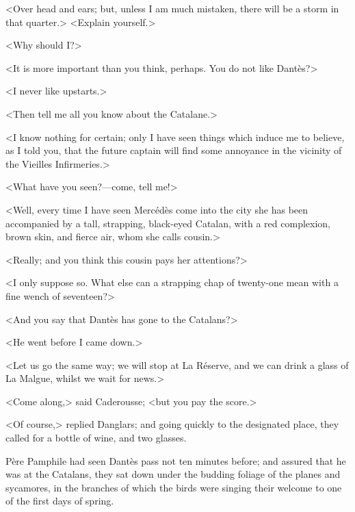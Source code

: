  <Over head and ears; but, unless I am much mistaken, there will be a storm in that quarter.>  <Explain yourself.> 

 <Why should I?> 

 <It is more important than you think, perhaps. You do not like Dantès?> 

 <I never like upstarts.> 

 <Then tell me all you know about the Catalane.> 

 <I know nothing for certain; only I have seen things which induce me to believe, as I told you, that the future captain will find some annoyance in the vicinity of the Vieilles Infirmeries.> 

 <What have you seen?—come, tell me!> 

 <Well, every time I have seen Mercédès come into the city she has been accompanied by a tall, strapping, black-eyed Catalan, with a red complexion, brown skin, and fierce air, whom she calls cousin.> 

 <Really; and you think this cousin pays her attentions?> 

 <I only suppose so. What else can a strapping chap of twenty-one mean with a fine wench of seventeen?> 

 <And you say that Dantès has gone to the Catalans?> 

 <He went before I came down.> 

 <Let us go the same way; we will stop at La Réserve, and we can drink a glass of La Malgue, whilst we wait for news.> 

 <Come along,> said Caderousse; <but you pay the score.> 

 <Of course,> replied Danglars; and going quickly to the designated place, they called for a bottle of wine, and two glasses. 

 Père Pamphile had seen Dantès pass not ten minutes before; and assured that he was at the Catalans, they sat down under the budding foliage of the planes and sycamores, in the branches of which the birds were singing their welcome to one of the first days of spring. 
